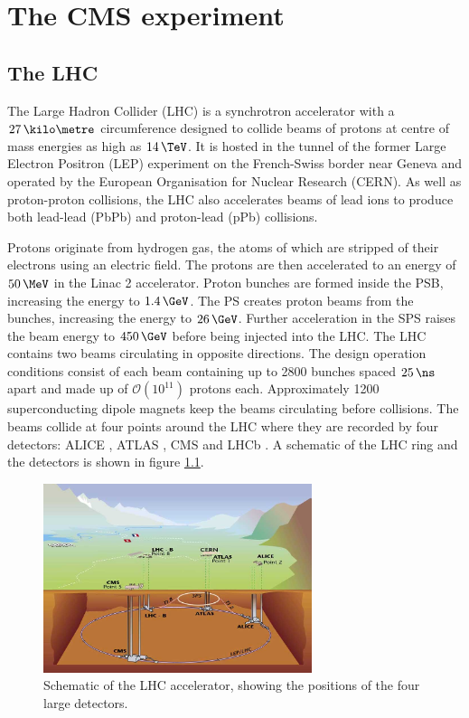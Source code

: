 \chapter{The CMS experiment}
\label{chap:detector}

\section{The LHC}
\label{sec:theLHC}

The Large Hadron Collider (LHC) \cite{theLHC} is a synchrotron accelerator
with a $27\,\kilo\metre$ circumference designed to
collide beams of protons at centre of mass energies as high as $14\,\TeV$. It is
hosted in the tunnel of the former Large Electron Positron (LEP) \cite{LEP:1983aa} experiment on the French-Swiss border
near Geneva and operated by the European Organisation for Nuclear Research
(CERN). As well as proton-proton collisions, the LHC also accelerates beams of
lead ions to produce both lead-lead (PbPb) and proton-lead (pPb) collisions.

Protons originate from hydrogen gas, the atoms of which are stripped of
their electrons using an electric field. The protons are then accelerated to an
energy of $50\,\MeV$ in the Linac 2 accelerator. Proton bunches are formed inside
the \ac{PSB}, increasing the energy to $1.4\,\GeV$. The \ac{PS} creates proton
beams from the bunches, increasing the energy to $26\,\GeV$. Further acceleration
in the \ac{SPS} raises the beam energy to $450\,\GeV$ before being injected into
the LHC. The LHC contains two beams circulating in opposite directions. The
design operation conditions consist of each beam containing up to 2800 bunches
spaced $25\,\ns$ apart and made up of $\mathcal{O}(10^{11})$ protons each. 
Approximately 1200 superconducting dipole magnets keep the beams circulating
before collisions. The beams collide at four points around the LHC where they
are recorded by four detectors: ALICE \cite{Aamodt:2008zz}, ATLAS
\cite{Aad:2008zzm}, CMS \cite{Chatrchyan:2008aa} and LHCb \cite{Alves:2008zz}. A
schematic of the LHC ring and the detectors is shown in figure
\ref{fig:LHCschematic}.

\begin{figure}[htbp]
   \includegraphics[width=0.7\textwidth]{plots/detector/LHC_layout_sch.jpg}
\caption{Schematic of the LHC accelerator, showing the positions of the four
large detectors.}
\label{fig:LHCschematic}
\end{figure}

